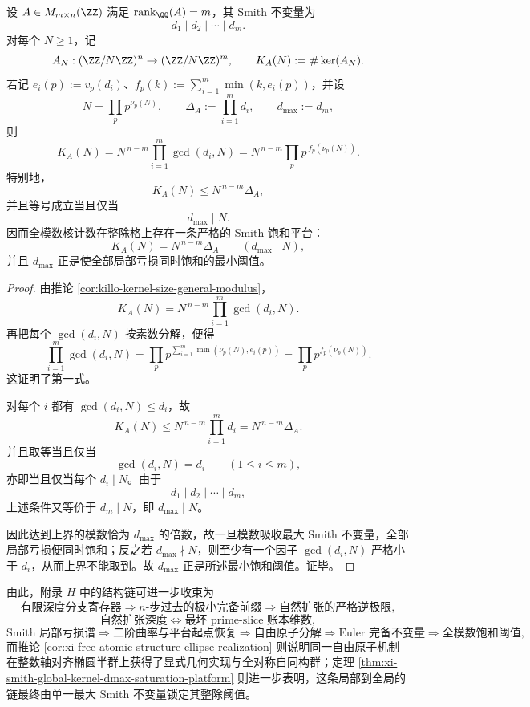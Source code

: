 \begin{theorem}\label{thm:xi-smith-global-kernel-dmax-saturation-platform}
设 \(A\in M_{m\times n}(\ZZ)\) 满足 \(\operatorname{rank}_{\QQ}(A)=m\)，其 Smith 不变量为
\[
d_1\mid d_2\mid\cdots\mid d_m.
\]
对每个 \(N\ge 1\)，记
\[
A_N:(\ZZ/N\ZZ)^n\to(\ZZ/N\ZZ)^m,
\qquad
K_A(N):=\#\ker(A_N).
\]
若记 \(e_i(p):=v_p(d_i)\)、\(f_p(k):=\sum_{i=1}^{m}\min(k,e_i(p))\)，并设
\[
N=\prod_p p^{\nu_p(N)},
\qquad
\Delta_A:=\prod_{i=1}^{m}d_i,
\qquad
d_{\max}:=d_m,
\]
则
\[
K_A(N)
=
N^{\,n-m}\prod_{i=1}^{m}\gcd(d_i,N)
=
N^{\,n-m}\prod_{p}p^{\,f_p(\nu_p(N))}.
\]
特别地，
\[
K_A(N)\le N^{\,n-m}\Delta_A,
\]
并且等号成立当且仅当
\[
d_{\max}\mid N.
\]
因而全模数核计数在整除格上存在一条严格的 Smith 饱和平台：
\[
K_A(N)=N^{\,n-m}\Delta_A
\qquad(d_{\max}\mid N),
\]
并且 \(d_{\max}\) 正是使全部局部亏损同时饱和的最小阈值。
\end{theorem}
\begin{proof}
由推论 \ref{cor:killo-kernel-size-general-modulus}，
\[
K_A(N)=N^{\,n-m}\prod_{i=1}^{m}\gcd(d_i,N).
\]
再把每个 \(\gcd(d_i,N)\) 按素数分解，便得
\[
\prod_{i=1}^{m}\gcd(d_i,N)
=
\prod_{p}p^{\sum_{i=1}^{m}\min(\nu_p(N),e_i(p))}
=
\prod_{p}p^{f_p(\nu_p(N))}.
\]
这证明了第一式。

对每个 \(i\) 都有 \(\gcd(d_i,N)\le d_i\)，故
\[
K_A(N)\le N^{\,n-m}\prod_{i=1}^{m}d_i
=
N^{\,n-m}\Delta_A.
\]
并且取等当且仅当
\[
\gcd(d_i,N)=d_i
\qquad(1\le i\le m),
\]
亦即当且仅当每个 \(d_i\mid N\)。由于
\[
d_1\mid d_2\mid\cdots\mid d_m,
\]
上述条件又等价于 \(d_m\mid N\)，即 \(d_{\max}\mid N\)。

因此达到上界的模数恰为 \(d_{\max}\) 的倍数，故一旦模数吸收最大 Smith 不变量，全部局部亏损便同时饱和；反之若 \(d_{\max}\nmid N\)，则至少有一个因子 \(\gcd(d_i,N)\) 严格小于 \(d_i\)，从而上界不能取到。故 \(d_{\max}\) 正是所述最小饱和阈值。证毕。
\end{proof}

\noindent
由此，附录 \(H\) 中的结构链可进一步收束为
\[
\text{有限深度分支寄存器}
\Longrightarrow
\text{\(n\)-步过去的极小完备前缀}
\Longrightarrow
\text{自然扩张的严格逆极限},
\]
\[
\text{自然扩张深度}
\Longleftrightarrow
\text{最坏 prime-slice 账本维数},
\]
\[
\text{Smith 局部亏损谱}
\Longrightarrow
\text{二阶曲率与平台起点恢复}
\Longrightarrow
\text{自由原子分解}
\Longrightarrow
\text{Euler 完备不变量}
\Longrightarrow
\text{全模数饱和阈值},
\]
而推论 \ref{cor:xi-free-atomic-structure-ellipse-realization} 则说明同一自由原子机制在整数轴对齐椭圆半群上获得了显式几何实现与全对称自同构群；定理 \ref{thm:xi-smith-global-kernel-dmax-saturation-platform} 则进一步表明，这条局部到全局的链最终由单一最大 Smith 不变量锁定其整除阈值。

\endinput

